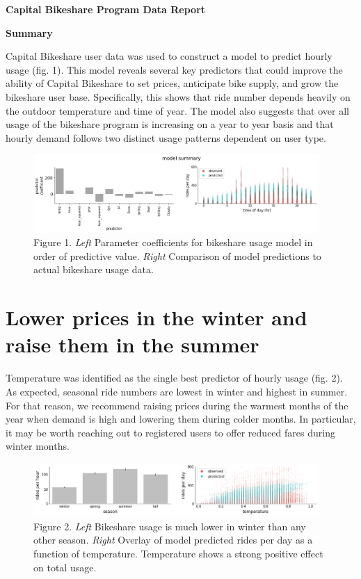 \documentclass[11pt]{article}
\begin{document}
	
\renewcommand*\rmdefault{phv}
\selectfont
	
\cleardoublepage

\newpage
\begin{center}\textbf{Capital Bikeshare Program Data Report}\end{center}
\textbf{Summary}

Capital Bikeshare user data was used to construct a model to predict hourly usage (fig. 1). This model reveals several key predictors that could improve the ability of Capital Bikeshare to set prices, anticipate bike supply, and grow the bikeshare user base. Specifically, this shows that ride number depends heavily on the outdoor temperature and time of year. The model also suggests that over all usage of the bikeshare program is increasing on a year to year basis and that hourly demand follows two distinct usage patterns dependent on user type.

\begin{figure}[h!]
	\centering
	\includegraphics[width=0.97\textwidth]{figs/model_summary.png}
	\caption*{\footnotesize Figure 1. \textit{Left} Parameter coefficients for bikeshare usage model in order of predictive value. \textit{Right} Comparison of model predictions to actual bikeshare usage data.}
\end{figure}

\section{Lower prices in the winter and raise them in the summer}

Temperature was identified as the single best predictor of hourly usage (fig. 2). As expected, seasonal ride numbers are lowest in winter and highest in summer. For that reason, we recommend raising prices during the warmest months of the year when demand is high and lowering them during colder months. In particular, it may be worth reaching out to registered users to offer reduced fares during winter months.

\begin{figure}[h!]
	\centering
	\includegraphics[width=0.97\textwidth]{figs/temp_effect.png}
	\caption*{\footnotesize Figure 2. \textit{Left} Bikeshare usage is much lower in winter than any other season. \textit{Right} Overlay of model predicted rides per day as a function of temperature. Temperature shows a strong positive effect on total usage.}
\end{figure}
\end{document}
